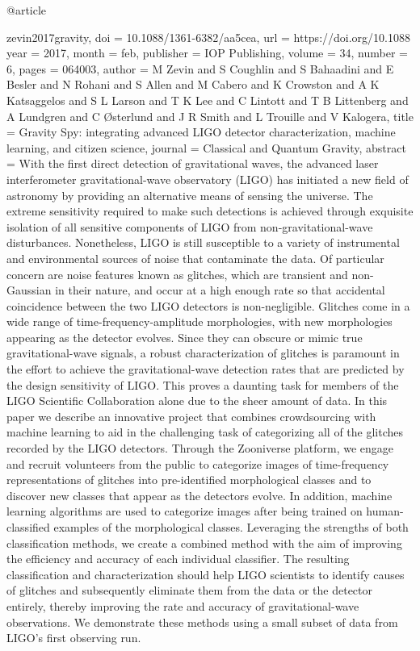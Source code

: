 {{{{{{@article{zevin2017gravity,
	doi = {10.1088/1361-6382/aa5cea},
	url = {https://doi.org/10.1088%
	year = 2017,
	month = {feb},
	publisher = {{IOP} Publishing},
	volume = {34},
	number = {6},
	pages = {064003},
	author = {M Zevin and S Coughlin and S Bahaadini and E Besler and N Rohani and S Allen and M Cabero and K Crowston and A K Katsaggelos and S L Larson and T K Lee and C Lintott and T B Littenberg and A Lundgren and C {\O}sterlund and J R Smith and L Trouille and V Kalogera},
	title = {Gravity Spy: integrating advanced {LIGO} detector characterization, machine learning, and citizen science},
	journal = {Classical and Quantum Gravity},
	abstract = {With the first direct detection of gravitational waves, the advanced laser interferometer gravitational-wave observatory (LIGO) has initiated a new field of astronomy by providing an alternative means of sensing the universe. The extreme sensitivity required to make such detections is achieved through exquisite isolation of all sensitive components of LIGO from non-gravitational-wave disturbances. Nonetheless, LIGO is still susceptible to a variety of instrumental and environmental sources of noise that contaminate the data. Of particular concern are noise features known as glitches, which are transient and non-Gaussian in their nature, and occur at a high enough rate so that accidental coincidence between the two LIGO detectors is non-negligible. Glitches come in a wide range of time-frequency-amplitude morphologies, with new morphologies appearing as the detector evolves. Since they can obscure or mimic true gravitational-wave signals, a robust characterization of glitches is paramount in the effort to achieve the gravitational-wave detection rates that are predicted by the design sensitivity of LIGO. This proves a daunting task for members of the LIGO Scientific Collaboration alone due to the sheer amount of data. In this paper we describe an innovative project that combines crowdsourcing with machine learning to aid in the challenging task of categorizing all of the glitches recorded by the LIGO detectors. Through the Zooniverse platform, we engage and recruit volunteers from the public to categorize images of time-frequency representations of glitches into pre-identified morphological classes and to discover new classes that appear as the detectors evolve. In addition, machine learning algorithms are used to categorize images after being trained on human-classified examples of the morphological classes. Leveraging the strengths of both classification methods, we create a combined method with the aim of improving the efficiency and accuracy of each individual classifier. The resulting classification and characterization should help LIGO scientists to identify causes of glitches and subsequently eliminate them from the data or the detector entirely, thereby improving the rate and accuracy of gravitational-wave observations. We demonstrate these methods using a small subset of data from LIGO’s first observing run.}
}

}}}}}}}
